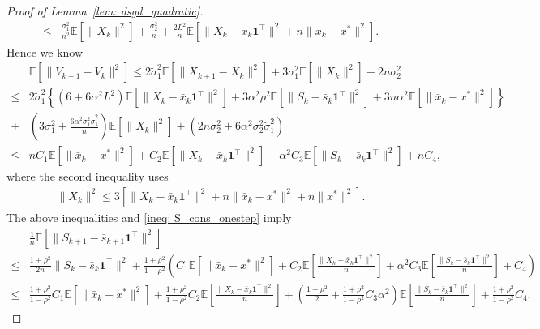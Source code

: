 \documentclass{article}
\theoremstyle{plain}
\theoremstyle{definition}
\theoremstyle{remark}
\newcommand{\E}{\mathbb{E}}
\newcommand{\bfonet}{\mathbf{1}^{\top}}
\begin{document}
\begin{proof}[Proof of Lemma~\ref{lem: dsgd_quadratic}]
\begin{align*}
        \leq & \frac{\sigma_1^2}{n^2}\E\left[\|X_k\|^2\right] + \frac{\sigma_2^2}{n} + \frac{2L^2}{n}\E\left[\|X_k-\bar{x}_k\bfonet\|^2 + n\|\bar{x}_k-x^*\|^2\right].
    \end{align*}
    Hence we know
    \begin{align*}
        &\E\left[\|V_{k+1} - V_k\|^2\right] \leq 2\tilde{\sigma}_1^2\E\left[\|X_{k+1}-X_k\|^2\right] + 3\sigma_1^2\E\left[\|X_k\|^2\right] + 2n\sigma_2^2\\
        \leq &2\tilde{\sigma}_1^2\left\{(6 + 6\alpha^2L^2)\E\left[\|X_k-\bar{x}_k\bfonet\|^2\right] + 3\alpha^2\rho^2\E\left[\|S_k-\bar{s}_k\bfonet\|^2\right] + 3n\alpha^2\E\left[\|\bar{x}_k-x^*\|^2\right]\right\} \\
        + &\left(3\sigma_1^2 + \frac{6\alpha^2\sigma_1^2\tilde{\sigma}_1^2}{n}\right)\E\left[\|X_k\|^2\right] + (2n\sigma_2^2 + 6\alpha^2\sigma_2^2\tilde{\sigma}_1^2) \\
        \leq &nC_1\E\left[\|\bar{x}_k - x^*\|^2\right] + C_2\E\left[\|X_k-\bar{x}_k\bfonet\|^2\right] + \alpha^2C_3\E\left[\|S_k-\bar{s}_k\bfonet\|^2\right] + nC_4,
    \end{align*}
    where the second inequality uses 
    \begin{align*}
        \|X_k\|^2\leq 3\left[\|X_k - \bar{x}_k\bfonet\|^2 + n\|\bar{x}_k - x^*\|^2 + n\|x^*\|^2\right].
    \end{align*}
    The above inequalities and \eqref{ineq: S_cons_onestep} imply
    \begin{equation}
        \begin{aligned}
            &\frac{1}{n}\E\left[\|S_{k+1} - \bar{s}_{k+1}\bfonet\|^2\right]\\
            \leq &\frac{1+\rho^2}{2n}\|S_k - \bar{s}_k\bfonet\|^2 + \frac{1+\rho^2}{1-\rho^2}
            \left(C_1\E\left[\|\bar{x}_k - x^*\|^2\right] + C_2\E\left[\frac{\|X_k-\bar{x}_k\bfonet\|^2}{n}\right] + \alpha^2C_3\E\left[\frac{\|S_k-\bar{s}_k\bfonet\|^2}{n}\right] + C_4\right) \\
            \leq &\frac{1+\rho^2}{1-\rho^2}C_1\E\left[\|\bar{x}_k - x^*\|^2\right] + \frac{1+\rho^2}{1-\rho^2}C_2\E\left[\frac{\|X_k - \bar{x}_k\bfonet\|^2}{n}\right] + \left(\frac{1+\rho^2}{2} + \frac{1+\rho^2}{1-\rho^2}C_3\alpha^2\right)\E\left[\frac{\|S_k-\bar{s}_k\bfonet\|^2}{n}\right] +\frac{1+\rho^2}{1-\rho^2}C_4.
        \end{aligned}

\end{equation}
\end{proof}
\end{document}
